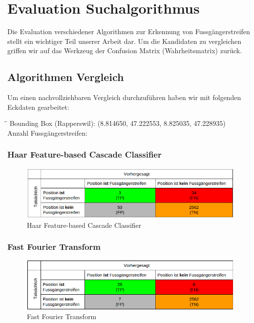 \section{Evaluation Suchalgorithmus}
Die Evaluation verschiedener Algorithmen zur Erkennung von Fussgängerstreifen stellt ein wichtiger Teil unserer Arbeit dar. Um die Kandidaten zu vergleichen griffen wir auf das Werkzeug der Confusion Matrix (Wahrheitsmatrix) zurück.

\subsection{Algorithmen Vergleich}
Um einen nachvollziehbaren Vergleich durchzuführen haben wir mit folgenden Eckdaten gearbeitet:
\begin{tabbing}
    \hspace*{6cm}\=\hspace*{6cm}\= \kill
    Bounding Box (Rapperswil): \> (8.814650, 47.222553, 8.825035, 47.228935) \\
    Anzahl Fussgängerstreifen:  \\
\end{tabbing}

\subsubsection{Haar Feature-based Cascade Classifier}
\begin{figure}[ht]
\includegraphics[width=\textwidth]{images/haar_conf.png}
\caption[Haar Feature-based Cascade Classifier]{Haar Feature-based Cascade Classifier}
\end{figure}
\subsubsection{Fast Fourier Transform}	
\begin{figure}[ht]
\includegraphics[width=\textwidth]{images/fast_fourier_conf.png}
\caption[Fast Fourier Transform]{Fast Fourier Transform}
\end{figure}
